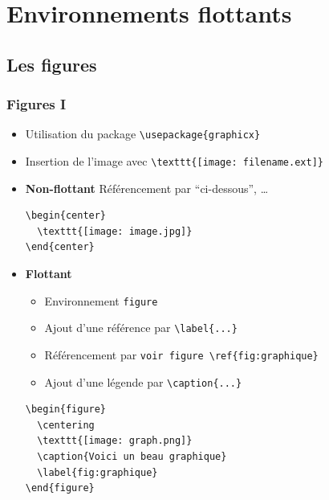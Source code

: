 \section{Environnements flottants}

\subsection{Les figures}

\begin{frame}[fragile]
  \frametitle{Figures I}
  \begin{itemize}

  \item Utilisation du package \lstinline|\usepackage{graphicx}|
  \item Insertion de l'image avec \lstinline|\texttt{[image: filename.ext]}|

  \item \textbf{Non-flottant}
    Référencement par ``ci-dessous'', \dots
    \begin{lstlisting}[style=nonumbers]
\begin{center}
  \texttt{[image: image.jpg]}
\end{center}
    \end{lstlisting}

  \item \textbf{Flottant}
      \begin{itemize}
          \item Environnement \lstinline|figure|
          \item Ajout d'une référence par \lstinline|\label{...}|
        \item Référencement par \lstinline|voir figure \ref{fig:graphique}|
        \item Ajout d'une légende par \lstinline|\caption{...}|
    \end{itemize}
    \begin{lstlisting}[style=nonumbers]
\begin{figure}
  \centering
  \texttt{[image: graph.png]}
  \caption{Voici un beau graphique}
  \label{fig:graphique}
\end{figure}
    \end{lstlisting}
\end{itemize}
\end{frame}

